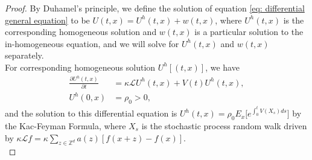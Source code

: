 \documentclass[sn-basic]{sn-jnl}%
\theoremstyle{thmstyleone}%
\theoremstyle{thmstyletwo}%
\theoremstyle{thmstylethree}%
\numberwithin{equation}{theorem}
\begin{document}
\begin{proof}
By Duhamel's principle, we define the solution of equation \eqref{eq: differential general equation} to be $U(t,x) = U^{h}(t,x) + w(t,x)$, where $U^{h}(t,x)$ is the corresponding homogeneous solution and $w(t,x)$ is a particular solution to the in-homogeneous equation, and we will solve for $U^{h}(t,x)$ and $w(t,x)$ separately.\\

For corresponding homogeneous solution $U^{h}[(t,x)]$, we have
\begin{align}
\displaystyle \frac{\partial U^{h}(t,x)}{\partial t} &= \kappa \mathcal{L} U^{h}(t,x) + V(t) U^{h}(t,x),\\
U^{h}(0,x) &= \rho_{0} > 0,
\end{align}
and the solution to this differential equation is $U^{h}(t,x) = \rho_{0}  E_{x} \Bigg[e^{\displaystyle \int_{0}^{t} V(X_{s}) ds}\Bigg]$ by the Kac-Feyman Formula, where $X_s$ is the stochastic process random walk driven by $
\kappa \mathcal{L} f = \kappa \sum\limits_{z \in \mathbb{Z}^d} a(z)[f(x+z) - f(x)]$.\\


\end{proof}
\end{document}
